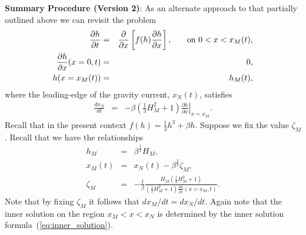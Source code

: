 \documentclass[11pt]{article}
\newcommand{\bea}{\begin{eqnarray}}
\newcommand{\eea}{\end{eqnarray}}
\begin{document}
{\bf Summary Procedure (Version 2)}: As an alternate approach to that partially outlined above we can revisit the problem
\bea
\label{eq:outer_h_v2}
\frac{\partial h}{\partial t} & = & \frac{\partial}{\partial x} \left[ f(h)\frac{\partial h}{\partial x} \right], \hspace{0.25in} \mbox{on $0 < x < x_M(t)$},\\
\label{eq:outer_bc1_v2}
\frac{\partial h}{\partial x}(x=0,t) & = & 0,\\
\label{eq:outer_bc2_v2}
h(x=x_M(t)) & = & h_M(t),
\eea
where the leading-edge of the gravity current, $x_N(t)$, satisfies
\bea
\label{eq:outer_bc3_v2}
\frac{dx_N}{dt} & = & - \beta \left( \frac{1}{3} H^2_M + 1 \right) \left. \frac{\partial h}{\partial x} \right|_{x=x_M}.
\eea
Recall that in the present context $f(h) = \frac{1}{3} h^3 + \beta h$.
Suppose we fix the value $\zeta_M$.  Recall that we have the relationships
\bea
\label{eq:hM_v2}
h_M & = & \beta^{\frac{1}{2}} H_M, \\
\label{eq:xM_v2}
x_M(t) & = & x_N(t) - \beta^{\frac{3}{2}} \zeta_M,\\
\label{eq:zM_v2}
\zeta_M & = & - \frac{1}{\beta} \frac{H_M \left( \frac{1}{9} H_M^2 + 1 \right) }{ \left( \frac{1}{3} H_M^2 + 1 \right) \frac{\partial h}{\partial x}(x=x_M,t) }.
\eea
Note that by fixing $\zeta_M$ it follows that $dx_M/dt = dx_N/dt$.
Again note that the inner solution on the region $x_M < x < x_N$ is determined by the inner solution formula~(\ref{eq:inner_solution}).
\end{document}
